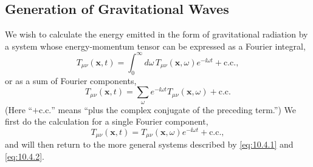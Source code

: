 
\subsection{Generation of Gravitational Waves}\label{sec:10.4}

We wish to calculate the energy emitted in the form of gravitational
radiation by a system whose energy-momentum tensor can be expressed as a
Fourier integral,
\begin{equation}
  T_{\mu\nu}(\mathbf{x},t)
  =
  \int_0^\infty d\omega\,
  T_{\mu\nu}(\mathbf{x},\omega)e^{-\ii\omega t}
  +\text{c.c.},
  \tag{10.4.1}\label{eq:10.4.1}
\end{equation}
or as a sum of Fourier components,
\begin{equation}
  T_{\mu\nu}(\mathbf{x},t)
  =
  \sum_\omega e^{-\ii\omega t}T_{\mu\nu}(\mathbf{x},\omega)
  +\text{c.c.}
  \tag{10.4.2}\label{eq:10.4.2}
\end{equation}
(Here ``\( +\text{c.c.}\)'' means ``plus the complex conjugate of the
preceding term.'') We first do the calculation for a single Fourier
component,
\begin{equation}
  T_{\mu\nu}(\mathbf{x},t)
  =
  T_{\mu\nu}(\mathbf{x},\omega)e^{-\ii\omega t}
  +\text{c.c.},
  \tag{10.4.3}\label{eq:10.4.3}
\end{equation}
and will then return to the more general systems described by
\eqref{eq:10.4.1} and \eqref{eq:10.4.2}.

